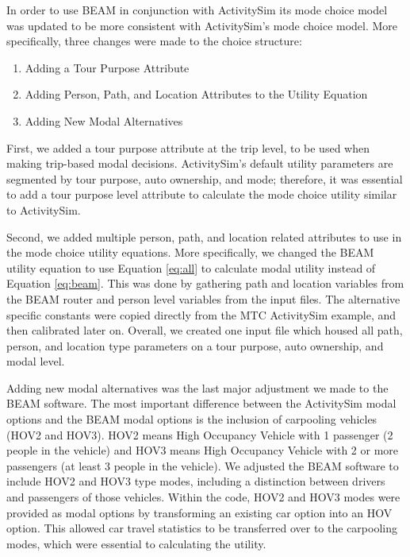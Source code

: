 \documentclass[simple, masters, twoside]{byuthesis}
\providecommand{\tightlist}{%
  \setlength{\itemsep}{0pt}\setlength{\parskip}{0pt}}
\begin{document}
In order to use BEAM in conjunction with ActivitySim its mode choice model was updated to be more consistent with ActivitySim's mode choice model. More specifically, three changes were made to the choice structure:

\begin{enumerate}
\def\labelenumi{\arabic{enumi}.}
\tightlist
\item
  Adding a Tour Purpose Attribute
\item
  Adding Person, Path, and Location Attributes to the Utility Equation
\item
  Adding New Modal Alternatives
\end{enumerate}

First, we added a tour purpose attribute at the trip level, to be used when making trip-based modal decisions. ActivitySim's default utility parameters are segmented by tour purpose, auto ownership, and mode; therefore, it was essential to add a tour purpose level attribute to calculate the mode choice utility similar to ActivitySim.

Second, we added multiple person, path, and location related attributes to use in the mode choice utility equations. More specifically, we changed the BEAM utility equation to use Equation \eqref{eq:all} to calculate modal utility instead of Equation \eqref{eq:beam}. This was done by gathering path and location variables from the BEAM router and person level variables from the input files. The alternative specific constants were copied directly from the MTC ActivitySim example, and then calibrated later on. Overall, we created one input file which housed all path, person, and location type parameters on a tour purpose, auto ownership, and modal level.

Adding new modal alternatives was the last major adjustment we made to the BEAM software. The most important difference between the ActivitySim modal options and the BEAM modal options is the inclusion of carpooling vehicles (HOV2 and HOV3). HOV2 means High Occupancy Vehicle with 1 passenger (2 people in the vehicle) and HOV3 means High Occupancy Vehicle with 2 or more passengers (at least 3 people in the vehicle). We adjusted the BEAM software to include HOV2 and HOV3 type modes, including a distinction between drivers and passengers of those vehicles. Within the code, HOV2 and HOV3 modes were provided as modal options by transforming an existing car option into an HOV option. This allowed car travel statistics to be transferred over to the carpooling modes, which were essential to calculating the utility.
\end{document}
